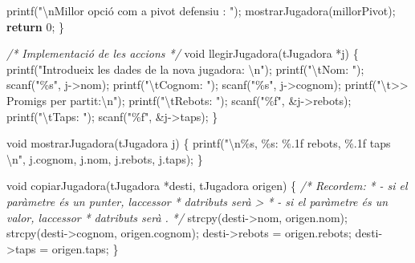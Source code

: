 \documentclass[]{book}
\newenvironment{Shaded}{\begin{snugshade}}{\end{snugshade}}
\newcommand{\CommentTok}[1]{\textcolor[rgb]{0.56,0.35,0.01}{\textit{#1}}}
\newcommand{\ControlFlowTok}[1]{\textcolor[rgb]{0.13,0.29,0.53}{\textbf{#1}}}
\newcommand{\DataTypeTok}[1]{\textcolor[rgb]{0.13,0.29,0.53}{#1}}
\newcommand{\DecValTok}[1]{\textcolor[rgb]{0.00,0.00,0.81}{#1}}
\newcommand{\NormalTok}[1]{#1}
\newcommand{\SpecialCharTok}[1]{\textcolor[rgb]{0.00,0.00,0.00}{#1}}
\newcommand{\StringTok}[1]{\textcolor[rgb]{0.31,0.60,0.02}{#1}}
\begin{document}
\begin{Shaded}
\begin{Highlighting}[]
\NormalTok{    printf(}\StringTok{"}\SpecialCharTok{\textbackslash{}n}\StringTok{Millor opció com a pivot defensiu : "}\NormalTok{);}
\NormalTok{    mostrarJugadora(millorPivot);}
    \ControlFlowTok{return} \DecValTok{0}\NormalTok{;}
\NormalTok{\}}

\CommentTok{/* Implementació de les accions */}
\DataTypeTok{void}\NormalTok{ llegirJugadora(tJugadora *j) \{}
\NormalTok{    printf(}\StringTok{"Introdueix les dades de la nova jugadora: }\SpecialCharTok{\textbackslash{}n}\StringTok{"}\NormalTok{);}
\NormalTok{    printf(}\StringTok{"}\SpecialCharTok{\textbackslash{}t}\StringTok{Nom: "}\NormalTok{);}
\NormalTok{    scanf(}\StringTok{"\%s"}\NormalTok{, j{-}\textgreater{}nom);}
\NormalTok{    printf(}\StringTok{"}\SpecialCharTok{\textbackslash{}t}\StringTok{Cognom: "}\NormalTok{);}
\NormalTok{    scanf(}\StringTok{"\%s"}\NormalTok{, j{-}\textgreater{}cognom);}
\NormalTok{    printf(}\StringTok{"}\SpecialCharTok{\textbackslash{}t}\StringTok{\textgreater{}\textgreater{} Promigs per partit:}\SpecialCharTok{\textbackslash{}n}\StringTok{"}\NormalTok{);}
\NormalTok{    printf(}\StringTok{"}\SpecialCharTok{\textbackslash{}t}\StringTok{Rebots: "}\NormalTok{);}
\NormalTok{    scanf(}\StringTok{"\%f"}\NormalTok{, \&j{-}\textgreater{}rebots);}
\NormalTok{    printf(}\StringTok{"}\SpecialCharTok{\textbackslash{}t}\StringTok{Taps: "}\NormalTok{);}
\NormalTok{    scanf(}\StringTok{"\%f"}\NormalTok{, \&j{-}\textgreater{}taps);}
\NormalTok{\}}

\DataTypeTok{void}\NormalTok{ mostrarJugadora(tJugadora j) \{}
\NormalTok{    printf(}\StringTok{"}\SpecialCharTok{\textbackslash{}n}\StringTok{\%s, \%s: \%.1f rebots, \%.1f taps }\SpecialCharTok{\textbackslash{}n}\StringTok{"}\NormalTok{, j.cognom, j.nom, j.rebots, j.taps);}
\NormalTok{\}}

\DataTypeTok{void}\NormalTok{ copiarJugadora(tJugadora *desti, tJugadora origen) \{}
    \CommentTok{/* Recordem: }
\CommentTok{     * {-} si el paràmetre és un punter, l\textquotesingle{}accessor }
\CommentTok{     * d\textquotesingle{}atributs serà \textquotesingle{}{-}\textgreater{}\textquotesingle{}}
\CommentTok{     * {-} si el paràmetre és un valor, l\textquotesingle{}accessor}
\CommentTok{     * d\textquotesingle{}atributs serà \textquotesingle{}.\textquotesingle{}}
\CommentTok{     */}
\NormalTok{    strcpy(desti{-}\textgreater{}nom, origen.nom);}
\NormalTok{    strcpy(desti{-}\textgreater{}cognom, origen.cognom);}
\NormalTok{    desti{-}\textgreater{}rebots = origen.rebots;}
\NormalTok{    desti{-}\textgreater{}taps = origen.taps;}
\NormalTok{\}}


\end{Highlighting}
\end{Shaded}
\end{document}
